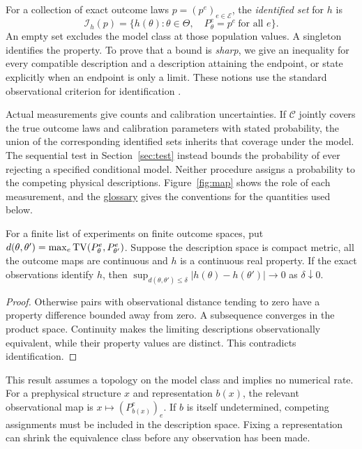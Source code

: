 \documentclass[11pt,letterpaper]{article}
\begin{document}
For a collection of exact outcome laws $p=(p^e)_{e\in\mathcal E}$, the \emph{identified set} for $h$ is
\[
  \mathcal I_h(p)=\{h(\theta):\theta\in\Theta,\quad P_\theta^e=p^e\ \text{for all }e\}.
\]
An empty set excludes the model class at those population values. A singleton identifies the property. To prove that a bound is \emph{sharp}, we give an inequality for every compatible description and a description attaining the endpoint, or state explicitly when an endpoint is only a limit. These notions use the standard observational criterion for identification \cite{rothenberg}.

Actual measurements give counts and calibration uncertainties. If $\mathcal C$ jointly covers the true outcome laws and calibration parameters with stated probability, the union of the corresponding identified sets inherits that coverage under the model. The sequential test in Section~\ref{sec:test} instead bounds the probability of ever rejecting a specified conditional model. Neither procedure assigns a probability to the competing physical descriptions. Figure~\ref{fig:map} shows the role of each measurement, and the \hyperref[sec:glossary]{glossary} gives the conventions for the quantities used below.

\begin{proposition}
For a finite list of experiments on finite outcome spaces, put $d(\theta,\theta')=\max_e\operatorname{TV}(P_\theta^e,P_{\theta'}^e)$. Suppose the description space is compact metric, all the outcome maps are continuous and $h$ is a continuous real property. If the exact observations identify $h$, then $\sup_{d(\theta,\theta')\le\delta}|h(\theta)-h(\theta')|\to0$ as $\delta\downarrow0$.
\end{proposition}
\begin{proof}
Otherwise pairs with observational distance tending to zero have a property difference bounded away from zero. A subsequence converges in the product space. Continuity makes the limiting descriptions observationally equivalent, while their property values are distinct. This contradicts identification.
\end{proof}
This result assumes a topology on the model class and implies no numerical rate. For a prephysical structure $x$ and representation $b(x)$, the relevant observational map is $x\mapsto(P_{b(x)}^e)_e$. If $b$ is itself undetermined, competing assignments must be included in the description space. Fixing a representation can shrink the equivalence class before any observation has been made.
\end{document}

